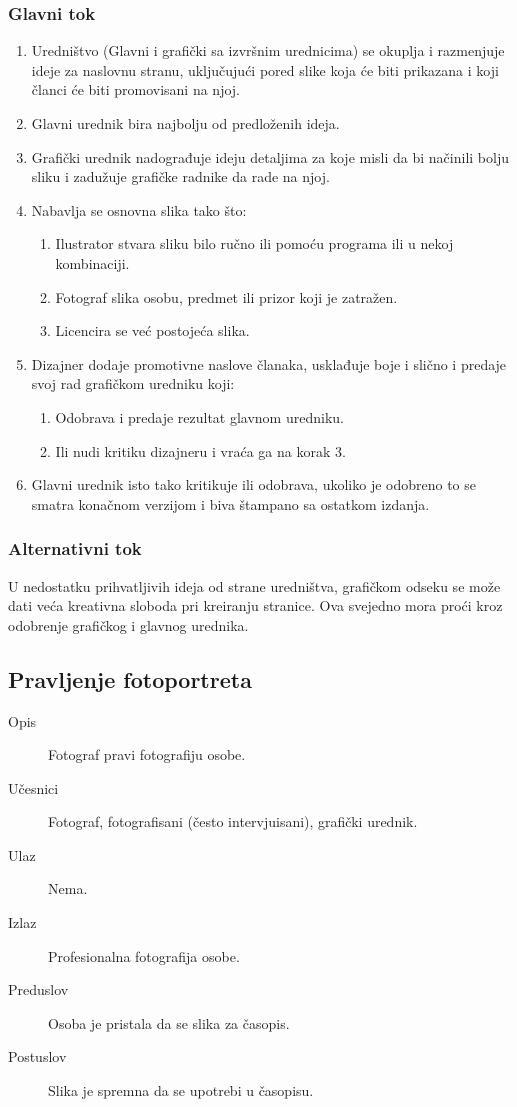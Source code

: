 \subsubsection{Glavni tok}
\begin{enumerate} 
\item Uredništvo (Glavni i grafički sa izvršnim urednicima) se okuplja i razmenjuje ideje za naslovnu stranu,
 uključujući pored slike koja će biti prikazana i koji članci će biti promovisani na njoj.
\item Glavni urednik bira najbolju od predloženih ideja.
\item Grafički urednik nadograđuje ideju detaljima za koje misli da bi načinili bolju sliku i zadužuje grafičke radnike da rade na njoj.
\item Nabavlja se osnovna slika tako što:
\begin{enumerate}
\item Ilustrator stvara sliku bilo ručno ili pomoću programa ili u nekoj kombinaciji.
\item Fotograf slika osobu, predmet ili prizor koji je zatražen.
\item Licencira se već postojeća slika.
\end{enumerate}
\item Dizajner dodaje promotivne naslove članaka, usklađuje boje i slično i predaje svoj rad grafičkom uredniku koji:
\begin{enumerate}
\item Odobrava i predaje rezultat glavnom uredniku.
\item Ili nudi kritiku dizajneru i vraća ga na korak 3.
\end{enumerate}
\item Glavni urednik isto tako kritikuje ili odobrava, ukoliko je odobreno to se smatra konačnom verzijom i biva štampano sa ostatkom izdanja. 
\end{enumerate}
\subsubsection{Alternativni tok}
U nedostatku prihvatljivih ideja od strane uredništva, grafičkom odseku se može dati veća kreativna sloboda pri kreiranju stranice. Ova svejedno mora proći kroz odobrenje grafičkog i glavnog urednika.

\subsection{Pravljenje fotoportreta}
\begin{description}
\item [Opis] Fotograf pravi fotografiju osobe.
\item [Učesnici] Fotograf, fotografisani (često intervjuisani), grafički urednik.
\item [Ulaz] Nema.
\item [Izlaz] Profesionalna fotografija osobe.
\item [Preduslov] Osoba je pristala da se slika za časopis.
\item [Postuslov] Slika je spremna da se upotrebi u časopisu.
\end{description}
